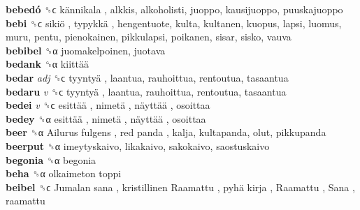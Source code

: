 \textbf{bebedó} ␝ϲ   kännikala , alkkis, alkoholisti, juoppo, kausijuoppo, puuskajuoppo  \\
\textbf{bebi} ␝ϲ   sikiö ,  typykkä , hengentuote, kulta, kultanen, kuopus, lapsi, luomus, muru, pentu, pienokainen, pikkulapsi, poikanen, sisar, sisko, vauva  \\
\textbf{bebibel} ␝α  juomakelpoinen, juotava  \\
\textbf{bedank} ␝α   kiittää   \\
\textbf{bedar} \emph{adj}  ␝ϲ   tyyntyä , laantua, rauhoittua, rentoutua, tasaantua  \\
\textbf{bedaru} \emph{v}  ␝ϲ   tyyntyä , laantua, rauhoittua, rentoutua, tasaantua  \\
\textbf{bedei} \emph{v}  ␝ϲ   esittää ,  nimetä ,  näyttää , osoittaa  \\
\textbf{bedey} ␝α   esittää ,  nimetä ,  näyttää , osoittaa  \\
\textbf{beer} ␝α   Ailurus fulgens ,  red panda , kalja, kultapanda, olut, pikkupanda  \\
\textbf{beerput} ␝α  imeytyskaivo, likakaivo, sakokaivo, saostuskaivo  \\
\textbf{begonia} ␝α  begonia  \\
\textbf{beha} ␝α   olkaimeton toppi   \\
\textbf{beibel} ␝ϲ   Jumalan sana ,  kristillinen Raamattu ,  pyhä kirja ,  Raamattu ,  Sana , raamattu  \\
